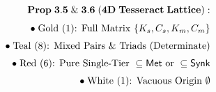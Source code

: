 \documentclass[preview]{standalone}
\begin{document}
\begin{align*}
\special{dvisvgm:raw <g id='unique000'>}\mathbf{Prop\;3.5\;\&\;3.6\;(4D\;Tesseract\;Lattice):}\\[4pt]\bullet\;\text{Gold (1): Full Matrix }\{K_s,C_s,K_m,C_m\}\\[3pt]\bullet\;\text{Teal (8): Mixed Pairs \& Triads (Determinate)}\\[3pt]\bullet\;\text{Red (6): Pure Single-Tier }\subseteq\mathsf{Met}\text{ or }\subseteq\mathsf{Synk}\\[3pt]\bullet\;\text{White (1): Vacuous Origin }\emptyset\special{dvisvgm:raw </g>}
\end{align*}
\end{document}
